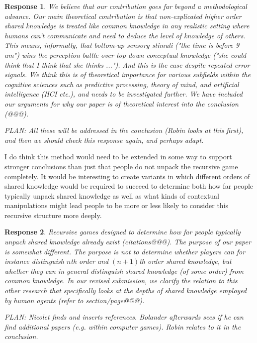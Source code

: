 \documentclass[a4paper]{article}
\newtheorem{response}{Response}
\begin{document}
\begin{response}
We believe that our contribution goes far beyond a methodological advance. Our main theoretical contribution is that non-explicated higher order shared knowledge is treated like common knowledge in any realistic setting where humans can't communicate and need to \emph{deduce} the level of knowledge of others. This means, informally, that bottom-up sensory stimuli ("the time is before 9 am") \emph{wins the perception battle} over top-down conceptual knowledge ("she could think that I think that she thinks ..."). And this is the case despite repeated error signals. We think this is of theoretical importance for various subfields within the cognitive sciences such as predictive processing, theory of mind, and artificial intelligence (HCI etc.), and needs to be investigated further. We have included our arguments for why our paper is of theoretical interest into the conclusion (@@@).

PLAN: All these will be addressed in the conclusion (Robin looks at this first), and then we should check this response again, and perhaps adapt. 
\end{response}

I do think this method would need to be extended in some way to support stronger conclusions than just that people do not unpack the recursive game completely. It would be interesting to create variants in which different orders of shared knowledge would be required to succeed to determine both how far people typically unpack shared knowledge as well as what kinds of contextual manipulations might lead people to be more or less likely to consider this recursive structure more deeply.

\begin{response} 
Recursive games designed to determine how far people typically unpack shared knowledge already exist (citations@@@). The purpose of our paper is somewhat different. The purpose is not to determine whether players can for instance distinguish $n$th order and $(n+1)$th order shared knowledge, but whether they can in general distinguish shared knowledge (of some order) from common knowledge. In our revised submission, we clarify the relation to this other research that specifically looks at the depths of shared knowledge employed by human agents (refer to section/page@@@). 


PLAN: Nicolet finds and inserts references. Bolander afterwards sees if he can find additional papers (e.g. within computer games). Robin relates to it in the conclusion.
\end{response}
\end{document}
